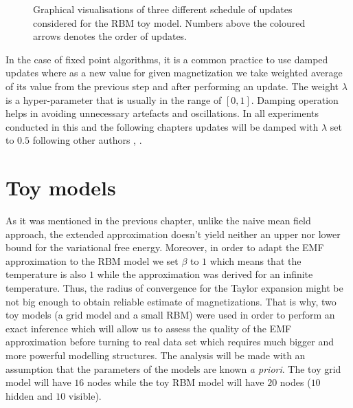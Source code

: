 \begin{figure}[!htb]
\begin{center}
\end{center}
\endminipage\hfill
 \caption[Graphical illustration of three different kinds of updates]{Graphical visualisations of three different schedule of updates considered for the RBM toy model. Numbers above the coloured arrows denotes the order of updates.}
\label{fig:updates}
\end{figure}

In the case of fixed point algorithms, it is a common practice to use damped updates \cite{murphy2012machine} where as a new value for given magnetization we take weighted average of its value from the previous step and after performing an update. The weight $\lambda$ is a hyper-parameter that is usually in the range of $[0,1]$. Damping operation helps in avoiding unnecessary artefacts and oscillations. In all experiments conducted in this and the following chapters updates will be damped with $\lambda$ set to $0.5$ following other authors \cite{gabrie2015training}, \cite{welling2002new}.

\section{Toy models}
As it was mentioned in the previous chapter, unlike the naive mean field approach, the extended approximation doesn't yield neither an upper nor lower bound for the variational free energy. Moreover, in order to adapt the EMF approximation to the RBM model we set $\beta$ to $1$ which means that the temperature is also $1$ while the approximation was derived for an infinite temperature. Thus, the radius of convergence for the Taylor expansion might be not big enough to obtain reliable estimate of magnetizations. That is why, two toy models (a grid model and a small RBM) were used in order to perform an exact inference which will allow us to assess the quality of the EMF approximation before turning to real data set which requires much bigger and more powerful modelling structures. The analysis will be made with an assumption that the parameters of the models are known \emph{a priori}. The toy grid model will have $16$ nodes while the toy RBM model will have $20$ nodes ($10$ hidden and $10$ visible).

